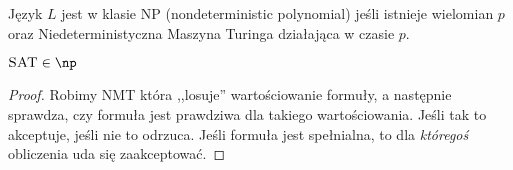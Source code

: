 \begin{definition}
    Język \( L \) jest w klasie NP (nondeterministic polynomial) jeśli istnieje wielomian \( p \) oraz Niedeterministyczna Maszyna Turinga działająca w czasie \( p \).
\end{definition}

\begin{theorem}
\(\textsc{SAT} \in \np \)
\end{theorem}
\begin{proof}
Robimy NMT która ,,losuje'' wartościowanie formuły, a następnie sprawdza, czy formuła jest prawdziwa dla takiego wartościowania. Jeśli tak to akceptuje, jeśli nie to odrzuca. Jeśli formuła jest spełnialna, to dla \textit{któregoś} obliczenia uda się zaakceptować. 
\end{proof}